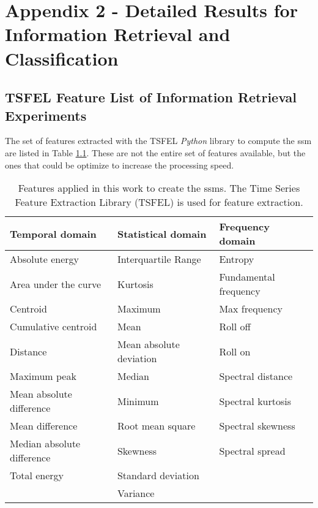 
%

\chapter{Appendix 2 - Detailed Results for Information Retrieval and Classification}
\label{appendix:tables_detailed}

\section{TSFEL Feature List of Information Retrieval Experiments}
\label{app:tsfel}

The set of features extracted with the TSFEL \textit{Python} library to compute the \gls{ssm} are listed in Table \ref{tab:tsfel_featurelist}. These are not the entire set of features available, but the ones that could be optimize to increase the processing speed.  

\begin{table}
    \centering
    \caption{Features applied in this work to create the \gls{ssm}s. The Time Series Feature Extraction Library (TSFEL) is used for feature extraction.}
    \begin{tabular}{l|l|l}
    \toprule
        \textbf{Temporal domain} &  \textbf{Statistical domain} & \textbf{Frequency domain}\\
    \midrule
        Absolute energy & Interquartile Range & Entropy\\
        Area under the curve & Kurtosis & Fundamental frequency\\
        Centroid & Maximum & Max frequency\\
        Cumulative centroid & Mean & Roll off\\
        Distance & Mean absolute deviation & Roll on \\
        Maximum peak & Median & Spectral distance\\
        Mean absolute difference & Minimum & Spectral kurtosis\\
        Mean difference & Root mean square & Spectral skewness\\
        Median absolute difference & Skewness & Spectral spread\\
        Total energy & Standard deviation & \\
         & Variance & \\
    \bottomrule
    \end{tabular}
    \label{tab:tsfel_featurelist}
\end{table}

